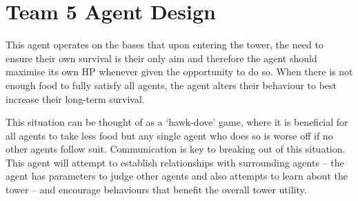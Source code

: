 \chapter{Team 5 Agent Design}\label{team_5_agent_design}

This agent operates on the bases that upon entering the tower, the need to ensure their own survival is their only aim and therefore the agent should maximise its own HP whenever given the opportunity to do so. When there is not enough food to fully satisfy all agents, the agent alters their behaviour to best increase their long-term survival.

This situation can be thought of as a `hawk-dove' game, where it is beneficial for all agents to take less food but any single agent who does so is worse off if no other agents follow suit. Communication is key to breaking out of this situation. This agent will attempt to establish relationships with surrounding agents -- the agent has parameters to judge other agents and also attempts to learn about the tower -- and encourage behaviours that benefit the overall tower utility.

